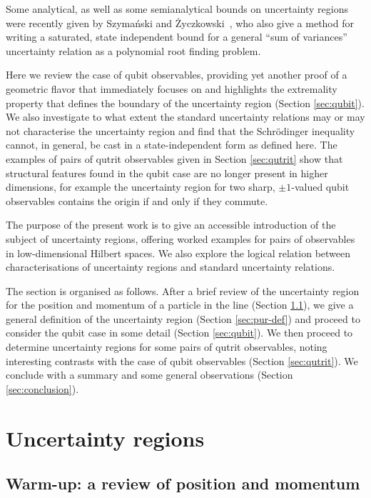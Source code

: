 Some analytical, as well as some semianalytical bounds on uncertainty regions were recently given by Szymański and \.{Z}yczkowski~\cite{SzymanskiZyczkowski2018}, who also give a method for writing a saturated, state independent bound for a general ``sum of variances'' uncertainty relation as a polynomial root finding problem.

Here we review the case of qubit observables, providing yet another proof of a geometric flavor that immediately focuses on and highlights the extremality property that defines the boundary of the uncertainty region (Section \ref{sec:qubit}). We also investigate to what extent the standard uncertainty relations may or may not characterise the uncertainty region and find that the Schr\"odinger inequality cannot, in general, be cast in a state-independent form as defined here. The examples of pairs of qutrit observables given in Section \ref{sec:qutrit} show that structural features found in the qubit case are no longer present in higher dimensions, for example the uncertainty region for two sharp, $\pm 1$-valued qubit observables contains the origin if and only if they commute.

The purpose of the present work is to give an accessible introduction of the subject of uncertainty regions, offering worked examples for pairs of observables in low-dimensional Hilbert spaces. We also explore the logical relation between characterisations of uncertainty regions and standard uncertainty relations.

The section is organised as follows. After a brief review of the uncertainty region for the position and momentum of a particle in the line (Section \ref{sec:qp}), we give a general definition of the uncertainty region (Section \ref{sec:pur-def}) and proceed to consider the qubit case in some detail (Section \ref{sec:qubit}). We then proceed to determine uncertainty regions for some pairs of qutrit observables, noting interesting contrasts with the case of qubit observables (Section \ref{sec:qutrit}). We conclude with a summary and some general observations (Section \ref{sec:conclusion}).

\section{Uncertainty regions}

\subsection{Warm-up: a review of position and momentum}\label{sec:qp}

